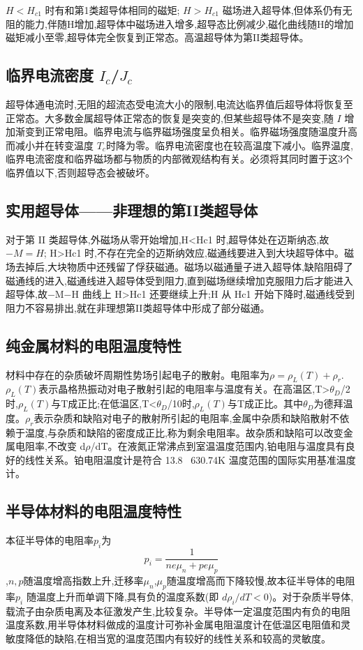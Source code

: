 \documentclass[12pt, a4paper]{article}
\begin{document}
$H<H_{c1}$ 时有和第1类超导体相同的磁矩; $H>H_{c1}$ 磁场进入超导体,但体系仍有无阻的能力,伴随H增加,超导体中磁场进入增多,超导态比例减少,磁化曲线随H的增加磁矩减小至零,超导体完全恢复到正常态。高温超导体为第II类超导体。

\subsection{临界电流密度 $I_c$/$J_c$}
超导体通电流时,无阻的超流态受电流大小的限制,电流达临界值后超导体将恢复至正常态。大多数金属超导体正常态的恢复是突变的,但某些超导体不是突变,随 $I$ 增加渐变到正常电阻。临界电流与临界磁场强度呈负相关。临界磁场强度随温度升高而减小并在转变温度 $T_c$时降为零。临界电流密度也在较高温度下减小。临界温度,临界电流密度和临界磁场都与物质的内部微观结构有关。必须将其同时置于这3个临界值以下,否则超导态会被破坏。

\subsection{实用超导体——非理想的第II类超导体}
对于第 II 类超导体,外磁场从零开始增加,H<Hc1 时,超导体处在迈斯纳态,故$-M=H$; H>Hc1 时,不存在完全的迈斯纳效应,磁通线要进入到大块超导体中。磁场去掉后,大块物质中还残留了俘获磁通。磁场以磁通量子进入超导体,缺陷阻碍了磁通线的进入,磁通线进入超导体受到阻力,直到磁场继续增加克服阻力后才能进入超导体,故−M−H 曲线上 H>Hc1 还要继续上升;H 从 Hc1 开始下降时,磁通线受到阻力不容易排出,就在非理想第II类超导体中形成了部分磁通。

\subsection{纯金属材料的电阻温度特性}
材料中存在的杂质破坏周期性势场引起电子的散射。电阻率为$\rho=\rho_L(T) + \rho_r$.$\rho_L(T)$表示晶格热振动对电子散射引起的电阻率与温度有关。在高温区,T>$\theta_D$/2 时,$\rho_L(T)$与T成正比;在低温区,T<$\theta_D$/10时,$\rho_L(T)$与T成正比。其中$\theta_D$为德拜温度。$\rho_r$表示杂质和缺陷对电子的散射所引起的电阻率,金属中杂质和缺陷散射不依赖于温度,与杂质和缺陷的密度成正比,称为剩余电阻率。故杂质和缺陷可以改变金属电阻率,不改变 d$\rho$/dT。在液氮正常沸点到室温温度范围内,铂电阻与温度具有良好的线性关系。铂电阻温度计是符合 13.8~ 630.74K 温度范围的国际实用基准温度计。

\subsection{半导体材料的电阻温度特性}
本征半导体的电阻率$p_i$为
\begin{equation}
    p_i = \frac{1}{ne\mu_n+pe\mu_p}
\end{equation}
,$n,p$随温度增高指数上升,迁移率$\mu_n$,$\mu_p$随温度增高而下降较慢,故本征半导体的电阻率$p_i$ 随温度上升而单调下降,具有负的温度系数(即 $d\rho_i/dT<0$)。对于杂质半导体,载流子由杂质电离及本征激发产生,比较复杂。半导体一定温度范围内有负的电阻温度系数,用半导体材料做成的温度计可弥补金属电阻温度计在低温区电阻值和灵敏度降低的缺陷,在相当宽的温度范围内有较好的线性关系和较高的灵敏度。
\end{document}
